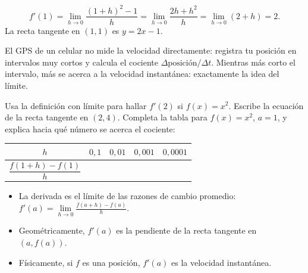 \documentclass[11pt]{article}
\begin{document}
\begin{ejemplo}[Tangente a $f(x)=x^2$ en $x=1$]
\[
  f'(1) = \lim_{h\to0}\frac{(1+h)^2-1}{h}
        = \lim_{h\to0}\frac{2h+h^2}{h}
        = \lim_{h\to0}(2+h) = 2.
\]
La recta tangente en $(1,1)$ es $y = 2x-1$.

\begin{center}
\end{center}
\end{ejemplo}

\begin{aplicacion}
El GPS de un celular no mide la velocidad directamente: registra tu
posición en intervalos muy cortos y calcula el cociente
$\Delta\text{posición}/\Delta t$. Mientras más corto el intervalo, más se
acerca a la velocidad instantánea: exactamente la idea del límite.
\end{aplicacion}

\begin{preguntas}
\pregunta Usa la definición con límite para hallar $f'(2)$ si $f(x)=x^2$.
Escribe la ecuación de la recta tangente en $(2,4)$.
\espacio{3cm}
\pregunta Completa la tabla para $f(x)=x^2$, $a=1$, y explica hacia qué
número se acerca el cociente:
\begin{center}
\begin{tabular}{c|cccc}
  $h$ & $0{,}1$ & $0{,}01$ & $0{,}001$ & $0{,}0001$\\\hline
  $\dfrac{f(1+h)-f(1)}{h}$ & & & & \\[2ex]
\end{tabular}
\end{center}
\end{preguntas}

\begin{resumen}
\begin{itemize}
  \item La derivada es el límite de las razones de cambio promedio:
        $f'(a) = \lim\limits_{h\to 0} \frac{f(a+h)-f(a)}{h}$.
  \item Geométricamente, $f'(a)$ es la pendiente de la recta tangente en
        $(a, f(a))$.
  \item Físicamente, si $f$ es una posición, $f'(a)$ es la velocidad instantánea.
\end{itemize}
\end{resumen}
\end{document}
